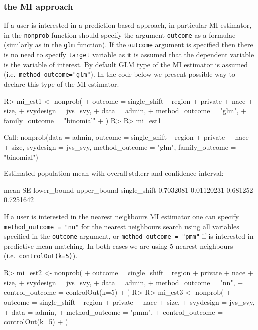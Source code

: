 \documentclass[
]{jss}
\begin{document}
\subsubsection{the MI approach}\label{the-mi-approach}

If a user is interested in a prediction-based approach, in particular MI
estimator, in the \texttt{nonprob} function should specify the argument
\texttt{outcome} as a formulae (similarly as in the \texttt{glm}
function). If the \texttt{outcome} argument is specified then there is
no need to specify \texttt{target} variable as it is assumed that the
dependent variable is the variable of interest. By default GLM type of
the MI estimator is assumed (i.e.~\texttt{method\_outcome="glm"}). In
the code below we present possible way to declare this type of the MI
estimator.

\begin{CodeChunk}
\begin{CodeInput}
R> mi_est1 <- nonprob(
+   outcome = single_shift ~ region + private + nace + size,
+   svydesign = jvs_svy,
+   data = admin,
+   method_outcome = "glm",
+   family_outcome = "binomial"
+ )
R> 
R> mi_est1
\end{CodeInput}
\begin{CodeOutput}

Call:
nonprob(data = admin, outcome = single_shift ~ region + private + 
    nace + size, svydesign = jvs_svy, method_outcome = "glm", 
    family_outcome = "binomial")

Estimated population mean with overall std.err and confidence interval:

                  mean         SE lower_bound upper_bound
single_shift 0.7032081 0.01120231    0.681252   0.7251642
\end{CodeOutput}
\end{CodeChunk}

If a user is interested in the nearest neighbours MI estimator one can
specify \texttt{method\_outcome\ =\ "nn"} for the nearest neighbours
search using all variables specified in the \texttt{outcome} argument,
or \texttt{method\_outcome\ =\ "pmm"} if is interested in predictive
mean matching. In both cases we are using 5 nearest neighbours
(i.e.~\texttt{controlOut(k=5)}).

\begin{CodeChunk}
\begin{CodeInput}
R> mi_est2 <- nonprob(
+   outcome = single_shift ~ region + private + nace + size,
+   svydesign = jvs_svy,
+   data = admin,
+   method_outcome = "nn",
+   control_outcome = controlOut(k=5)
+ )
R> 
R> mi_est3 <- nonprob(
+   outcome = single_shift ~ region + private + nace + size,
+   svydesign = jvs_svy,
+   data = admin,
+   method_outcome = "pmm",
+   control_outcome = controlOut(k=5)
+ )
\end{CodeInput}
\end{CodeChunk}
\end{document}
